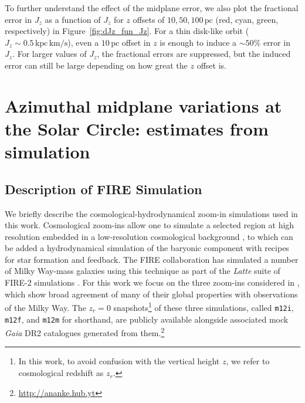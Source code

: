 \documentclass[twocolumn]{aastex62}
\newcommand{\pc}{\text{pc}}
\newcommand{\kms}{\text{km}/\text{s}}
\newcommand{\actunit}{\text{kpc}\,\kms}
\newcommand{\mi}{\texttt{m12i}}
\newcommand{\mf}{\texttt{m12f}}
\newcommand{\mm}{\texttt{m12m}}
\newcommand{\z}{z_r}
\begin{document}
To further understand the effect of the midplane error, we also plot the
fractional error in $J_z$ as a function of $J_z$ for $z$ offsets of $10, 50,
100\,\pc$ (red, cyan, green, respectively) in Figure~\ref{fig:dJz_fun_Jz}. For
a thin disk-like orbit ($J_z\sim0.5\,\actunit$), even a $10\,\pc$ offset in
$z$ is enough to induce a $\sim50\%$ error in $J_z$. For larger values of
$J_z$, the fractional errors are suppressed, but the induced error can still
be large depending on how great the $z$ offset is.

\section{Azimuthal midplane variations at the Solar Circle: estimates from
simulation} \label{sec:local_fire}
\subsection{Description of FIRE Simulation} \label{ssec:cosmozoom}
We briefly describe the cosmological-hydrodynamical zoom-in simulations used
in this work. Cosmological zoom-ins allow one to simulate a selected region at
high resolution embedded in a low-resolution cosmological background
\citep[e.g.][]{1993ApJ...412..455K,2014MNRAS.437.1894O}, to which can be added
a hydrodynamical simulation of the baryonic component with recipes for star
formation and feedback. The FIRE collaboration has simulated a number of Milky
Way-mass galaxies using this technique as part of the {\em Latte} suite of
FIRE-2 simulations \citep{2016ApJ...827L..23W,2018MNRAS.481.4133G}. For this
work we focus on the three zoom-ins considered in \citet{2018arXiv180610564S},
which show broad agreement of many of their global properties with
observations of the Milky Way. The $\z=0$ snapshots\footnote{In this work, to
avoid confusion with the vertical height $z$, we refer to cosmological
redshift as $\z$.} of these three simulations, called \mi{}, \mf{}, and \mm{}
for shorthand, are publicly available alongside associated mock {\em Gaia} DR2
catalogues generated from them.\footnote{\url{http://ananke.hub.yt}}
\end{document}
